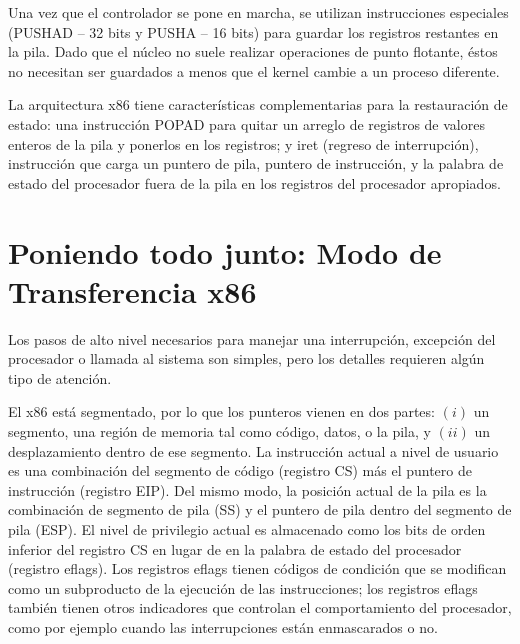 \documentclass[10pt]{book}
\begin{document}
Una vez que el controlador se pone en marcha, se utilizan instrucciones especiales ({\mf PUSHAD} -- 32 bits y {\mf PUSHA} -- 16 bits) para guardar los registros restantes en la pila. Dado que el núcleo no suele realizar operaciones de punto flotante, éstos no necesitan ser guardados a menos que el kernel cambie a un proceso diferente.

La arquitectura {\mf x86} tiene características complementarias para la restauración de estado: una instrucción {\mf POPAD} para quitar un arreglo de registros de valores enteros de la pila y ponerlos en los registros; y {\mf iret} (regreso de interrupción), instrucción que carga un puntero de pila, puntero de instrucción, y la palabra de estado del procesador fuera de la pila en los registros del procesador apropiados.

\section{Poniendo todo junto: Modo de Transferencia x86}
Los pasos de alto nivel necesarios para manejar una interrupción, excepción del procesador o llamada al sistema son simples, pero los detalles requieren algún tipo de atención.

El {\mf x86} está segmentado, por lo que los punteros vienen en dos partes: $(i)$ un segmento, una región de memoria tal como código, datos, o la pila, y $(ii)$ un desplazamiento dentro de ese segmento. La instrucción actual a nivel de usuario es una combinación del segmento de código (registro {\mf CS}) más el puntero de instrucción (registro {\mf EIP}). Del mismo modo, la posición actual de la pila es la combinación de segmento de pila ({\mf SS}) y el puntero de pila dentro del segmento de pila ({\mf ESP}). El nivel de privilegio actual es almacenado como los bits de orden inferior del registro {\mf CS} en lugar de en la palabra de estado del procesador (registro {\mf eflags}). Los registros {\mf eflags} tienen códigos de condición que se modifican como un subproducto de la ejecución de las instrucciones; los registros {\mf eflags} también tienen otros indicadores que controlan el comportamiento del procesador, como por ejemplo cuando las interrupciones están enmascarados o no.
\end{document}
